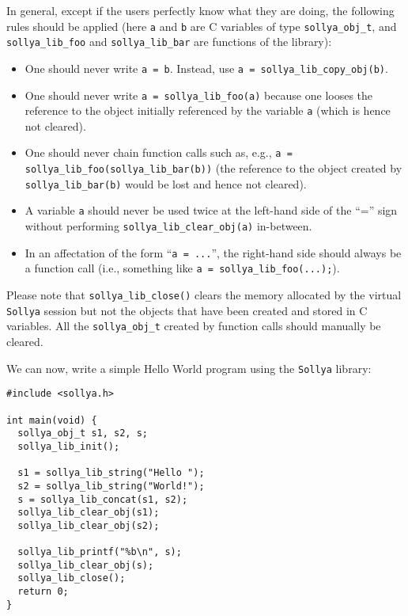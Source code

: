 \documentclass[a4paper]{article}
\newcommand{\sollya}{\texttt{Sollya}\xspace}
\begin{document}
In general, except if the users perfectly know what they are doing, the following rules should be applied (here \texttt{a} and \texttt{b} are C variables of type \texttt{sollya\_obj\_t}, and \texttt{sollya\_lib\_foo} and \texttt{sollya\_lib\_bar} are functions of the library):
\begin{itemize}
\item One should never write \texttt{a = b}. Instead, use \texttt{a = sollya\_lib\_copy\_obj(b)}.
\item One should never write \texttt{a = sollya\_lib\_foo(a)} because one looses the reference to the object initially referenced by the variable \texttt{a} (which is hence not cleared).
\item One should never chain function calls such as, e.g., \texttt{a = sollya\_lib\_foo(sollya\_lib\_bar(b))} (the reference to the object created by \texttt{sollya\_lib\_bar(b)} would be lost and hence not cleared).
\item A variable \texttt{a} should never be used twice at the left-hand side of the ``='' sign without performing \texttt{sollya\_lib\_clear\_obj(a)} in-between.
\item In an affectation of the form ``\texttt{a = ...}'', the right-hand side should always be a function call (i.e., something like \texttt{a = sollya\_lib\_foo(...);}).
\end{itemize}

Please note that \texttt{sollya\_lib\_close()} clears the memory allocated by the virtual \sollya session but not the objects that have been created and stored in C variables. All the \texttt{sollya\_obj\_t} created by function calls should manually be cleared.

We can now, write a simple Hello World program using the \sollya library:
\begin{center}\begin{minipage}{15cm}\begin{Verbatim}[frame=single]
#include <sollya.h>

int main(void) {
  sollya_obj_t s1, s2, s;
  sollya_lib_init();

  s1 = sollya_lib_string("Hello ");
  s2 = sollya_lib_string("World!");
  s = sollya_lib_concat(s1, s2);
  sollya_lib_clear_obj(s1);
  sollya_lib_clear_obj(s2);

  sollya_lib_printf("%b\n", s);
  sollya_lib_clear_obj(s);
  sollya_lib_close();
  return 0;
}
\end{Verbatim}
\end{minipage}\end{center}
\end{document}
